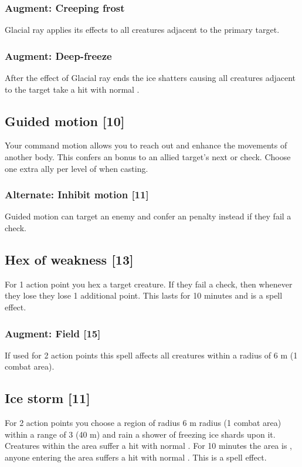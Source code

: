 \subsubsection{Augment: Creeping frost}
Glacial ray applies its effects to all creatures adjacent to the primary target.
\subsubsection{Augment: Deep-freeze}
After the effect of Glacial ray ends the ice shatters causing all creatures adjacent to the target take a hit with normal .

\subsection{Guided motion [10]}
Your command motion allows you to reach out and enhance the movements of another body. This confers an  bonus to an allied target's next  or  check. Choose one extra ally per level of  when casting.
\subsubsection{Alternate: Inhibit motion [11]}
Guided motion can target an enemy and confer an  penalty instead if they fail a  check.

\subsection{Hex of weakness [13]}
For 1 action point you hex a target creature. If they fail a  check, then whenever they lose  they lose 1 additional point. This lasts for 10 minutes and  is a  spell effect.

\subsubsection{Augment: Field [15]}
If used for 2 action points this spell affects all creatures within a radius of 6 m (1 combat area).

\subsection{Ice storm [11]}
For 2 action points you choose a region of radius 6 m radius (1 combat area) within a range of 3 (40 m) and rain a shower of freezing ice shards upon it. Creatures within the area suffer a hit with normal . For 10 minutes the area is , anyone entering the area suffers a hit with normal . This is a  spell effect.
